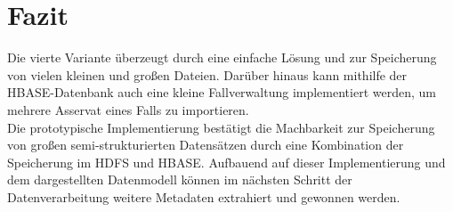 \section{Fazit} 
Die vierte Variante überzeugt durch eine einfache Lösung und zur Speicherung von vielen kleinen und großen Dateien. Darüber hinaus kann mithilfe der HBASE-Datenbank auch eine kleine Fallverwaltung implementiert werden, um mehrere Asservat eines Falls zu importieren.\\ Die prototypische Implementierung bestätigt die Machbarkeit zur Speicherung von großen semi-strukturierten Datensätzen durch eine Kombination der Speicherung im HDFS und HBASE. Aufbauend auf dieser Implementierung und dem dargestellten Datenmodell können im nächsten Schritt der Datenverarbeitung weitere Metadaten extrahiert und gewonnen werden. 